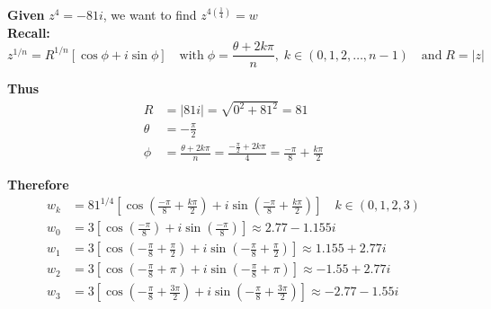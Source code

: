 \documentclass[a4paper, 8pt]{extarticle}
\begin{document}
\begin{examplebox}[: Determine all solutions to $z^4 = -81i$ and find a polynomial $p(z)$ with complex coefficients with root $w$ and $p(\overline{w}) \neq 0$]
	\label{sol:20188Q1b}
	\textbf{Given} $z^4 = -81i$, we want to find $z^{4\left(\frac{1}{4}\right)} = w $ \\
	\textbf{Recall:}
	$$z^{1/n} = R^{1/n}[\cos\phi + i\sin \phi] \quad \text{with} \; \phi = \frac{\theta + 2k\pi}{n}, \; k \in (0,1,2,\dots, n-1) \quad \text{and} \; R = |z|$$
	\begin{minipage}{0.49\textwidth}
		\textbf{Thus}
		\begin{align*}
			R      & = |81i| = \sqrt{0^2 + 81^2} = 81                                                                \\
			\theta & = -\frac{\pi}{2}                                                                                \\
			\phi   & = \frac{\theta + 2k\pi}{n} = \frac{-\frac{\pi}{2} + 2k\pi}{4} = \frac{-\pi}{8} + \frac{k\pi}{2}
		\end{align*}
	\end{minipage}
	\begin{minipage}{0.5\textwidth}
		\begin{center}
		\end{center}
	\end{minipage}

	\textbf{Therefore}
	\begin{align*}
		w_k & = 81^{1/4}\left[\cos\left(\frac{-\pi}{8} + \frac{k\pi}{2}\right) + i\sin\left(\frac{-\pi}{8} + \frac{k\pi}{2}\right)\right] \quad k \in (0,1,2,3) \\
		w_0 & = 3\left[\cos\left(\frac{-\pi}{8}\right) + i\sin\left(\frac{-\pi}{8}\right)\right] \approx 2.77 - 1.155i                                          \\
		w_1 & = 3\left[\cos\left(-\frac{\pi}{8} + \frac{\pi}{2}\right) + i\sin\left(-\frac{\pi}{8} + \frac{\pi}{2}\right)\right] \approx 1.155 + 2.77i          \\
		w_2 & = 3\left[\cos\left(-\frac{\pi}{8} + \pi\right) + i\sin\left(-\frac{\pi}{8} + \pi\right)\right] \approx -1.55 + 2.77i                              \\
		w_3 & = 3\left[\cos\left(-\frac{\pi}{8} + \frac{3\pi}{2}\right) + i\sin\left(-\frac{\pi}{8} + \frac{3\pi}{2}\right)\right] \approx -2.77 - 1.55i
	\end{align*}



\end{examplebox}
\end{document}
